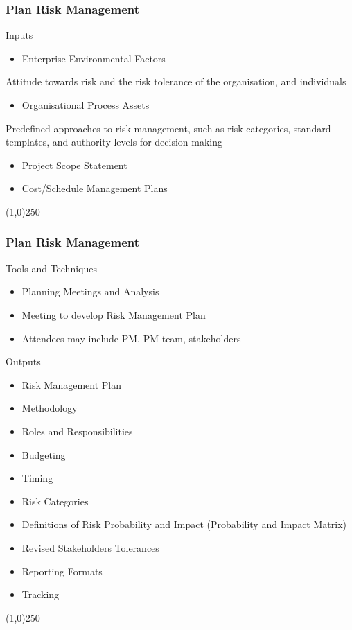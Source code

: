 \begin{frame}
\frametitle{Plan Risk Management}
Inputs
\begin{itemize}
	\item Enterprise Environmental Factors
\end{itemize}
Attitude towards risk and the risk tolerance of the organisation, and individuals
\begin{itemize}
	\item Organisational Process Assets
\end{itemize}
Predefined approaches to risk management, such as risk categories, standard templates, and authority levels for decision making
\begin{itemize}
	\item Project Scope Statement
	\item Cost/Schedule Management Plans
\end{itemize}
\end{frame}\begin{center}\line(1,0){250}\end{center}




\begin{frame}
\frametitle{Plan Risk Management}
Tools and Techniques
\begin{itemize}
	\item Planning Meetings and Analysis
	\item Meeting to develop Risk Management Plan
	\item Attendees may include PM, PM team, stakeholders
\end{itemize}
Outputs
\begin{itemize}
	\item Risk Management Plan
	\item Methodology
	\item Roles and Responsibilities
	\item Budgeting
	\item Timing
	\item Risk Categories
	\item Definitions of Risk Probability and Impact (Probability and Impact Matrix)
	\item Revised Stakeholders Tolerances
	\item Reporting Formats
	\item Tracking
\end{itemize}
\end{frame}\begin{center}\line(1,0){250}\end{center}





